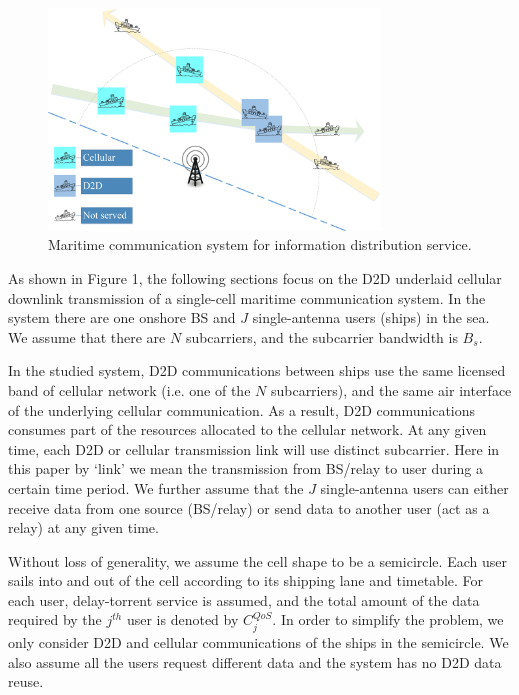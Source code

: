 \documentclass{ieeeaccess}
\begin{document}
\begin{figure} [htb]
\includegraphics*[width=8.8cm]{SysModel.eps}
\caption{Maritime communication system for information distribution service.}\label{fig:1}
\end{figure}



As shown in Figure 1, the following sections focus on the D2D underlaid cellular downlink transmission of a single-cell maritime communication system. In the system there are one onshore BS
and  $J$ single-antenna users (ships) in the sea. We assume that there are $N$ subcarriers, and the subcarrier bandwidth is ${B_s}$. 

In the studied system, D2D communications between ships use the same licensed band of cellular network (i.e. one of the $N$ subcarriers), and the same air interface of the underlying cellular communication. As a result, D2D communications consumes part of the resources allocated to the cellular network.
At any given time, each D2D or cellular transmission link will use distinct subcarrier. Here in this paper by `link' we mean the transmission from BS/relay to user during a certain time period. We further assume that the $J$ single-antenna users can either receive data from one source (BS/relay) or send data to another user (act as a relay) at any given time.

Without loss of generality, we assume the cell shape to be a semicircle. 
Each user sails into and out of the cell according to its shipping lane and timetable. For each user, delay-torrent service is assumed, and the total amount of the data required by the ${j^{th}}$ user is denoted by $C_j^{QoS}$. In order to simplify the problem, we only consider D2D and cellular communications of the ships in the semicircle. We also assume all the users request different data and the system has no D2D data reuse.
\end{document}
